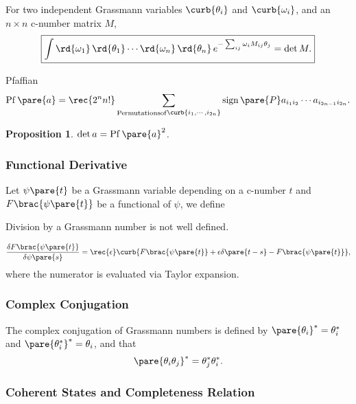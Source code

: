 \documentclass[hidelinks]{article}
\newtheorem{proposition}{Proposition}
\DeclareMathOperator{\Pfaffian}{Pf}
\DeclareMathOperator{\sign}{sign}
\begin{document}
For two independent Grassmann variables $\curb{\theta_i}$ and $\curb{\omega_i}$, and an $n\times n$ c-number matrix $M$,
\begin{equation}
    \label{eq:gaussian_integral_to_det}
    \boxed{\int\rd{\omega_1}\,\rd{\theta_1}\cdots \rd{\omega_n}\,\rd{\theta_n}\, e^{-\sum_{ij}\omega_i M_{ij} \theta_j} = \det M.}
\end{equation}\vspace{-\baselineskip}
\begin{termdef}{Pfaffian}
    \[ \Pfaffian\pare{a} = \rec{2^n n!}\sum_{\substack{\mathrm{Permutations of}}{\curb{i_1,\cdots,i_{2n}}}} \sign\pare{P} a_{i_1i_2}\cdots a_{i_{2n-1}i_{2n}}. \]
\end{termdef}
\begin{proposition}
    $\det a = \Pfaffian\pare{a}^2$.
\end{proposition}


\subsubsection{Functional Derivative} %
\label{ssub:functional_derivative}

Let $\psi\pare{t}$ be a Grassmann variable depending on a c-number $t$ and $F\brac{\psi\pare{t}}$ be a functional of $\psi$, we define \begin{marginwarns}
    Division by a Grassmann number is not well defined.
\end{marginwarns}
\[ \frac{\delta F\brac{\psi\pare{t}}}{\delta \psi\pare{s}} = \rec{\epsilon}\curb{F\brac{\psi\pare{t}} + \epsilon \delta\pare{t-s} - F\brac{\psi\pare{t}}}, \]
where the numerator is evaluated via Taylor expansion.


\subsubsection{Complex Conjugation} %
\label{ssub:complex_conjugation}

The complex conjugation of Grassmann numbers is defined by $\pare{\theta_i}^* = \theta_i^*$ and $\pare{\theta_i^*}^* = \theta_i$, and that
\[ \pare{\theta_i\theta_j}^* = \theta_j^*\theta_i^*. \]


\subsubsection{Coherent States and Completeness Relation} %
\label{ssub:coherent_states_and_completeness_relation}
\end{document}
